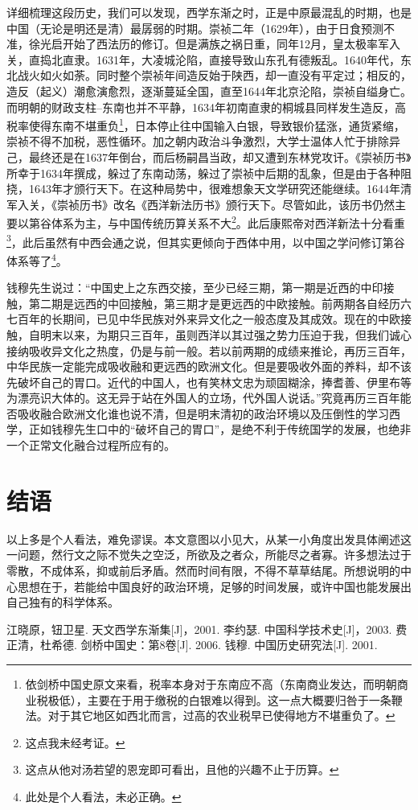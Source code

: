\documentclass{article}
\begin{document}
详细梳理这段历史，我们可以发现，西学东渐之时，正是中原最混乱的时期，也是中国（无论是明还是清）最孱弱的时期。崇祯二年（1629年），由于日食预测不准，徐光启开始了西法历的修订。但是满族之祸日重，同年12月，皇太极率军入关，直捣北直隶。1631年，大凌城沦陷，直接导致山东孔有德叛乱。1640年代，东北战火如火如荼。同时整个崇祯年间造反始于陕西，却一直没有平定过；相反的，造反（起义）潮愈演愈烈，逐渐蔓延全国，直至1644年北京沦陷，崇祯自缢身亡。而明朝的财政支柱--东南也并不平静，1634年初南直隶的桐城县同样发生造反，高税率使得东南不堪重负\footnote{依剑桥中国史原文来看，税率本身对于东南应不高（东南商业发达，而明朝商业税极低），主要在于用于缴税的白银难以得到。这一点大概要归咎于一条鞭法。对于其它地区如西北而言，过高的农业税早已使得地方不堪重负了。}，日本停止往中国输入白银，导致银价猛涨，通货紧缩，崇祯不得不加税，恶性循环。加之朝内政治斗争激烈，大学士温体人忙于排除异己，最终还是在1637年倒台，而后杨嗣昌当政，却又遭到东林党攻讦。《崇祯历书》所幸于1634年撰成，躲过了东南动荡，躲过了崇祯中后期的乱象，但是由于各种阻挠，1643年才颁行天下。在这种局势中，很难想象天文学研究还能继续。1644年清军入关，《崇祯历书》改名《西洋新法历书》颁行天下。尽管如此，该历书仍然主要以第谷体系为主，与中国传统历算关系不大\footnote{这点我未经考证。}。此后康熙帝对西洋新法十分看重\footnote{这点从他对汤若望的恩宠即可看出，且他的兴趣不止于历算。}，此后虽然有中西会通之说，但其实更倾向于西体中用，以中国之学问修订第谷体系等了\footnote{此处是个人看法，未必正确。}。

钱穆先生说过：“中国史上之东西交接，至少已经三期，第一期是近西的中印接触，第二期是远西的中回接触，第三期才是更远西的中欧接触。前两期各自经历六七百年的长期间，已见中华民族对外来异文化之一般态度及其成效。现在的中欧接触，自明末以来，为期只三百年，虽则西洋以其过强之势力压迫于我，但我们诚心接纳吸收异文化之热度，仍是与前一般。若以前两期的成绩来推论，再历三百年，中华民族一定能完成吸收融和更远西的欧洲文化。但是要吸收外面的养料，却不该先破坏自己的胃口。近代的中国人，也有笑林文忠为顽固糊涂，捧耆善、伊里布等为漂亮识大体的。这无异于站在外国人的立场，代外国人说话。”究竟再历三百年能否吸收融合欧洲文化谁也说不清，但是明末清初的政治环境以及压倒性的学习西学，正如钱穆先生口中的“破坏自己的胃口”，是绝不利于传统国学的发展，也绝非一个正常文化融合过程所应有的。
\section*{结语}
以上多是个人看法，难免谬误。本文意图以小见大，从某一小角度出发具体阐述这一问题，然行文之际不觉失之空泛，所欲及之者众，所能尽之者寡。许多想法过于零散，不成体系，抑或前后矛盾。然而时间有限，不得不草草结尾。所想说明的中心思想在于，若能给中国良好的政治环境，足够的时间发展，或许中国也能发展出自己独有的科学体系。

\begin{thebibliography}{}
  江晓原，钮卫星. 天文西学东渐集[J]，2001.
  李约瑟. 中国科学技术史[J]，2003.
费正清，杜希德. 剑桥中国史：第8卷[J]. 2006.
钱穆. 中国历史研究法[J]. 2001.
\end{thebibliography}
\end{document}
